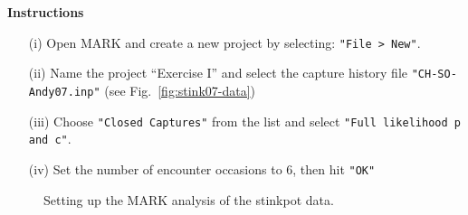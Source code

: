 \documentclass[12pt]{article}\usepackage[]{graphicx}\usepackage[]{color}
\begin{document}
\clearpage

{\bf Instructions}
\begin{enumerate}
  \item[(i)] Open MARK and create a new project by selecting:
    \verb+"File > New"+.
  \item[(ii)] Name the project ``Exercise I'' and select the capture
    history file \verb+"CH-SO-Andy07.inp"+ (see
    Fig.~\ref{fig:stink07-data})
  \item[(iii)] Choose \verb+"Closed Captures"+ from the list and select
    \verb+"Full likelihood p and c"+.
  \item[(iv)] Set the number of encounter occasions to 6, then hit
    \verb+"OK"+
\end{enumerate}

\begin{figure}[h!]
  \centering
  \caption{\small Setting up the MARK analysis of the stinkpot data.}
  \label{fig:stink07-mark}
\end{figure}
\end{document}
